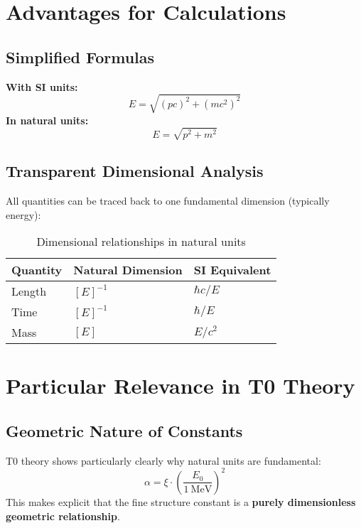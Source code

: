 \documentclass[12pt,a4paper]{article}
\begin{document}
	\section{Advantages for Calculations}
	
	\subsection{Simplified Formulas}
	\textbf{With SI units:}
	\begin{equation}
		E = \sqrt{(p c)^2 + (m c^2)^2}
	\end{equation}
	\textbf{In natural units:}
	\begin{equation}
		E = \sqrt{p^2 + m^2}
	\end{equation}
	
	\subsection{Transparent Dimensional Analysis}
	All quantities can be traced back to one fundamental dimension (typically energy):
	\begin{table}[h]
		\centering
		\begin{tabular}{lll}
			\toprule
			\textbf{Quantity} & \textbf{Natural Dimension} & \textbf{SI Equivalent} \\
			\midrule
			Length & $[E]^{-1}$ & $\hbar c / E$ \\
			Time & $[E]^{-1}$ & $\hbar / E$ \\
			Mass & $[E]$ & $E/c^2$ \\
			\bottomrule
		\end{tabular}
		\caption{Dimensional relationships in natural units}
	\end{table}
	
	\section{Particular Relevance in T0 Theory}
	
	\subsection{Geometric Nature of Constants}
	T0 theory shows particularly clearly why natural units are fundamental:
	\begin{equation}
		\alpha = \xi \cdot \left( \frac{E_0}{1~\mathrm{MeV}} \right)^2
	\end{equation}
	This makes explicit that the fine structure constant is a \textbf{purely dimensionless geometric relationship}.
	
\end{document}
